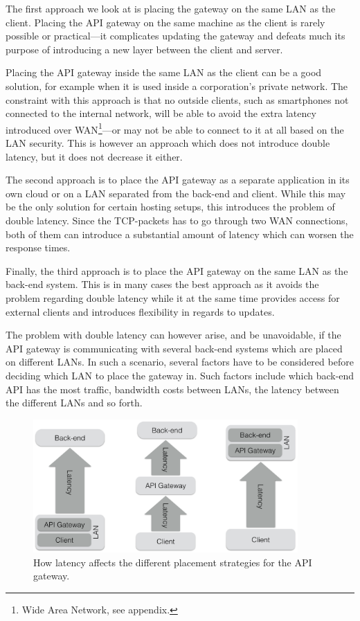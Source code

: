 \documentclass{cslthse-msc}
\begin{document}
The first approach we look at is placing the gateway on the same LAN as the client. Placing the API gateway on the same machine as the client is rarely possible or practical---it complicates updating the gateway and defeats much its purpose of introducing a new layer between the client and server. 

Placing the API gateway inside the same LAN as the client can be a good solution, for example when it is used inside a corporation's private network. The constraint with this approach is that no outside clients, such as smartphones not connected to the internal network, will be able to avoid the extra latency introduced over WAN\footnote{Wide Area Network, see appendix.}---or may not be able to connect to it at all based on the LAN security. This is however an approach which does not introduce double latency, but it does not decrease it either.

The second approach is to place the API gateway as a separate application in its own cloud or on a LAN separated from the back-end and client. While this may be the only solution for certain hosting setups, this introduces the problem of double latency. Since the TCP-packets has to go through two WAN connections, both of them can introduce a substantial amount of latency which can worsen the response times.

Finally, the third approach is to place the API gateway on the same LAN as the back-end system. This is in many cases the best approach as it avoids the problem regarding double latency while it at the same time provides access for external clients and introduces flexibility in regards to updates. 

The problem with double latency can however arise, and be unavoidable, if the API gateway is communicating with several back-end systems which are placed on different LANs. In such a scenario, several factors have to be considered before deciding which LAN to place the gateway in. Such factors include which back-end API has the most traffic, bandwidth costs between LANs, the latency between the different LANs and so forth.

\begin{figure}[H]
  \centering
    \begin{center}
      \includegraphics[width=0.9\textwidth]{images/api_gateway_latency.png}
    \end{center}
  \caption{How latency affects the different placement strategies for the API gateway.}
\end{figure}
\end{document}
